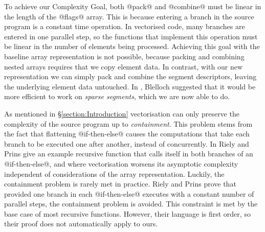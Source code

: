 To achieve our Complexity Goal, both @pack@ and @combine@ must be linear in the length of the @flags@ array. This is because entering a branch in the source program is a constant time operation. In vectorised code, many branches are entered in one parallel step, so the functions that implement this operation must be linear in the number of elements being processed. Achieving this goal with the baseline array representation is not possible, because packing and combining nested arrays requires that we copy element data. In contrast, with our new representation we can simply pack and combine the segment descriptors, leaving the underlying element data untouched. In \cite{Blelloch:compiling-collection-oriented-languages}, Blelloch suggested that it would be more efficient to work on \emph{sparse segments}, which we are now able to do.

As mentioned in \S\ref{section:Introduction} vectorisation can only preserve the complexity of the source program up to \emph{containment}. This problem stems from the fact that flattening @if-then-else@ causes the computations that take each branch to be executed one after another, instead of concurrently. In \cite{Riely:flattening-improvement} Riely and Prins give an example recursive function that calls itself in both branches of an @if-then-else@, and where vectorisation worsens its asymptotic complexity independent of considerations of the array representation. Luckily, the containment problem is rarely met in practice. Riely and Prins prove that provided one branch in each @if-then-else@ executes with a constant number of parallel steps, the containment problem is avoided. This constraint is met by the base case of most recursive functions. However, their language is first order, so their proof does not automatically apply to ours.

